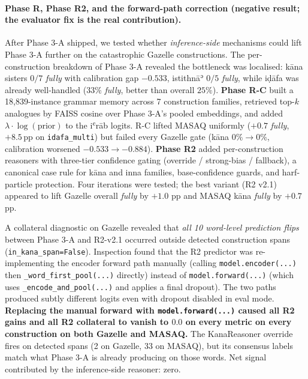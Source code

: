 \documentclass[10pt,a4paper,twocolumn]{article}
\begin{document}
\paragraph{Phase R, Phase R2, and the forward-path correction (negative result; the evaluator fix is the real contribution).}
\label{sec:phaseR2}
After Phase 3-A shipped, we tested whether \emph{inference-side} mechanisms could lift Phase 3-A further on the catastrophic Gazelle constructions. The per-construction breakdown of Phase 3-A revealed the bottleneck was localised: kāna sisters $0/7$ \emph{fully} with calibration gap $-0.533$, istithnāʾ $0/5$ \emph{fully}, while iḍāfa was already well-handled ($33\%$ \emph{fully}, better than overall $25\%$). \textbf{Phase R-C} built a 18,839-instance grammar memory across 7 construction families, retrieved top-$k$ analogues by FAISS cosine over Phase 3-A's pooled embeddings, and added $\lambda \cdot \log(\text{prior})$ to the iʿrāb logits. R-C lifted MASAQ uniformly ($+0.7$ \emph{fully}, $+8.5$\,pp on \texttt{idafa\_multi}) but failed every Gazelle gate (kāna $0\% \rightarrow 0\%$, calibration worsened $-0.533 \rightarrow -0.884$). \textbf{Phase R2} added per-construction reasoners with three-tier confidence gating (override / strong-bias / fallback), a canonical case rule for kāna and inna families, base-confidence guards, and harf-particle protection. Four iterations were tested; the best variant (R2 v2.1) appeared to lift Gazelle overall \emph{fully} by $+1.0$ pp and MASAQ kāna \emph{fully} by $+0.7$ pp.

A collateral diagnostic on Gazelle revealed that \emph{all 10 word-level prediction flips} between Phase 3-A and R2-v2.1 occurred outside detected construction spans (\texttt{in\_kana\_span=False}). Inspection found that the R2 predictor was re-implementing the encoder forward path manually (calling \texttt{model.encoder(...)} then \texttt{\_word\_first\_pool(...)} directly) instead of \texttt{model.forward(...)} (which uses \texttt{\_encode\_and\_pool(...)} and applies a final dropout). The two paths produced subtly different logits even with dropout disabled in eval mode. \textbf{Replacing the manual forward with \texttt{model.forward(...)} caused all R2 gains and all R2 collateral to vanish to $0.0$ on every metric on every construction on both Gazelle and MASAQ.} The KanaReasoner override fires on detected spans (2 on Gazelle, 33 on MASAQ), but its consensus labels match what Phase 3-A is already producing on those words. Net signal contributed by the inference-side reasoner: zero.
\end{document}
